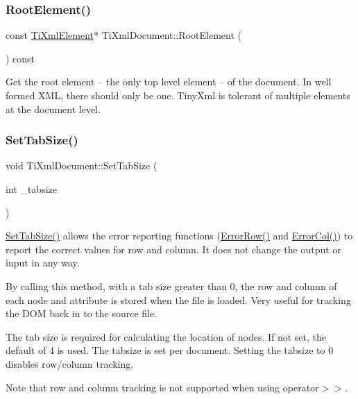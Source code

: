 \subsubsection{\texorpdfstring{Root\+Element()}{RootElement()}}
{\footnotesize\ttfamily const \hyperlink{classTiXmlElement}{Ti\+Xml\+Element}$\ast$ Ti\+Xml\+Document\+::\+Root\+Element (\begin{DoxyParamCaption}{ }\end{DoxyParamCaption}) const\hspace{0.3cm}{\ttfamily [inline]}}

Get the root element -- the only top level element -- of the document. In well formed X\+ML, there should only be one. Tiny\+Xml is tolerant of multiple elements at the document level. \mbox{\label{classTiXmlDocument_a51dac56316f89b35bdb7d0d433ba988e}} 
\subsubsection{\texorpdfstring{Set\+Tab\+Size()}{SetTabSize()}}
{\footnotesize\ttfamily void Ti\+Xml\+Document\+::\+Set\+Tab\+Size (\begin{DoxyParamCaption}\item[{int}]{\+\_\+tabsize }\end{DoxyParamCaption})\hspace{0.3cm}{\ttfamily [inline]}}

\hyperlink{classTiXmlDocument_a51dac56316f89b35bdb7d0d433ba988e}{Set\+Tab\+Size()} allows the error reporting functions (\hyperlink{classTiXmlDocument_a062e5257128a7da31b0b2e38cd524600}{Error\+Row()} and \hyperlink{classTiXmlDocument_adea69de889449a2587afb8ee043f43f5}{Error\+Col()}) to report the correct values for row and column. It does not change the output or input in any way.

By calling this method, with a tab size greater than 0, the row and column of each node and attribute is stored when the file is loaded. Very useful for tracking the D\+OM back in to the source file.

The tab size is required for calculating the location of nodes. If not set, the default of 4 is used. The tabsize is set per document. Setting the tabsize to 0 disables row/column tracking.

Note that row and column tracking is not supported when using operator$>$$>$.

